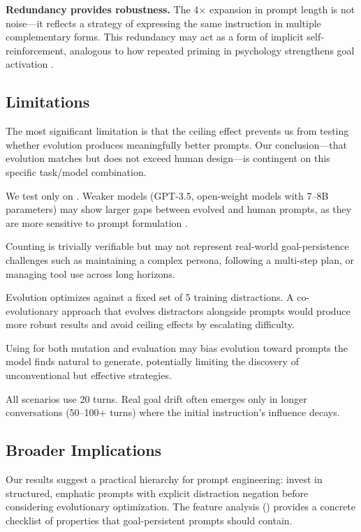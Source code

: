 {\bf Redundancy provides robustness.}
The 4$\times$ expansion in prompt length is not noise---it reflects a strategy of expressing the same instruction in multiple complementary forms.
This redundancy may act as a form of implicit self-reinforcement, analogous to how repeated priming in psychology strengthens goal activation \citep{bargh2001automaticity}.

\subsection{Limitations}

The most significant limitation is that the ceiling effect prevents us from testing whether evolution produces meaningfully better prompts.
Our conclusion---that evolution matches but does not exceed human design---is contingent on this specific task/model combination.

We test only on \gptmini.
Weaker models (\eg GPT-3.5, open-weight models with 7--8B parameters) may show larger gaps between evolved and human prompts, as they are more sensitive to prompt formulation \citep{arike2025goaldrift}.

Counting is trivially verifiable but may not represent real-world goal-persistence challenges such as maintaining a complex persona, following a multi-step plan, or managing tool use across long horizons.

Evolution optimizes against a fixed set of 5 training distractions.
A co-evolutionary approach \citep{aegis2025} that evolves distractors alongside prompts would produce more robust results and avoid ceiling effects by escalating difficulty.

Using \gptmini for both mutation and evaluation may bias evolution toward prompts the model finds natural to generate, potentially limiting the discovery of unconventional but effective strategies.

All scenarios use 20 turns.
Real goal drift often emerges only in longer conversations (50--100+ turns) where the initial instruction's influence decays.

\subsection{Broader Implications}

Our results suggest a practical hierarchy for prompt engineering: invest in structured, emphatic prompts with explicit distraction negation before considering evolutionary optimization.
The feature analysis () provides a concrete checklist of properties that goal-persistent prompts should contain.


